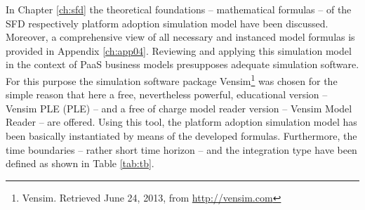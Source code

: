 In Chapter \ref{ch:sfd} the theoretical foundations -- mathematical formulas -- of the \ac{SFD} respectively platform adoption simulation model have been discussed. Moreover, a comprehensive view of all necessary and instanced model formulas is provided in Appendix \ref{ch:app04}. Reviewing and applying this simulation model in the context of \ac{PaaS} business models presupposes adequate simulation software. For this purpose the simulation software package Vensim\footnote{Vensim. Retrieved June 24, 2013, from \url{http://vensim.com}} was chosen for the simple reason that here a free, nevertheless powerful, educational version -- Vensim \acs{PLE} (\acl{PLE}) -- and a free of charge model reader version -- Vensim Model Reader -- are offered. Using this tool, the platform adoption simulation model has been basically instantiated by means of the developed formulas. Furthermore, the time boundaries -- rather short time horizon -- and the integration type have been defined as shown in Table \ref{tab:tb}.


